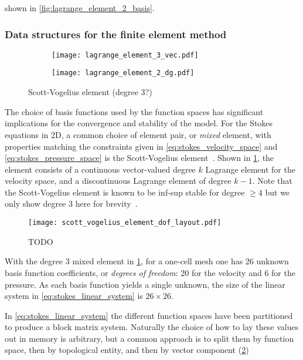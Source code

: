 \documentclass[thesis]{subfiles}
\begin{document}
shown in \cref{fig:lagrange_element_2_basis}.

\subsubsection{Data structures for the finite element method}

\begin{figure}
  \centering
  \hfill
  \begin{subfigure}{.4\textwidth}
    \texttt{[image: lagrange\_element\_3\_vec.pdf]}
  \end{subfigure}
  \hfill
  \begin{subfigure}{.4\textwidth}
    \texttt{[image: lagrange\_element\_2\_dg.pdf]}
  \end{subfigure}
  \hfill
  \caption{Scott-Vogelius element (degree 3?)}
  \label{fig:scott_vogelius_element}
\end{figure}

The choice of basis functions used by the function spaces has significant implications for the convergence and stability of the model.
For the Stokes equations in 2D, a common choice of element pair, or \textit{mixed} element, with properties matching the constraints given in \cref{eq:stokes_velocity_space} and \cref{eq:stokes_pressure_space} is the Scott-Vogelius element~\cite{scottNormEstimatesMaximal1985}.
Shown in \cref{fig:scott_vogelius_element}, the element consists of a continuous vector-valued degree $k$ Lagrange element for the velocity space, and a discontinuous Lagrange element of degree $k-1$.
Note that the Scott-Vogelius element is known to be inf-sup stable for degree $\geq 4$ but we only show degree 3 here for brevity~\cite{guzmanScottVogeliusFiniteElements2018}.

\begin{figure}
  \centering
  \texttt{[image: scott\_vogelius\_element\_dof\_layout.pdf]}
  \caption{TODO}
  \label{fig:scott_vogelius_element_dof_layout}
\end{figure}

With the degree 3 mixed element in \cref{fig:scott_vogelius_element}, for a one-cell mesh one has 26 unknown basis function coefficients, or \textit{degrees of freedom}: 20 for the velocity and 6 for the pressure.
As each basis function yields a single unknown, the size of the linear system in \cref{eq:stokes_linear_system} is $26 \times 26$.

In \cref{eq:stokes_linear_system} the different function spaces have been partitioned to produce a block matrix system.
Naturally the choice of how to lay these values out in memory is arbitrary, but a common approach is to split them by function space, then by topological entity, and then by vector component (\cref{fig:scott_vogelius_element_dof_layout})
\end{document}
